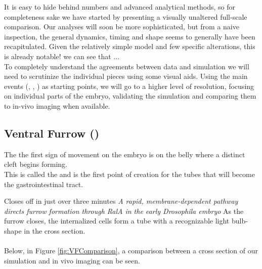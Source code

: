 It is easy to hide behind numbers and advanced analytical methods, so for completeness sake we have started by presenting a visually unaltered full-scale comparison. Our analyses will soon be more sophisticated, but from a naive inspection, the general dynamics, timing and shape seems to generally have been recapitulated. Given the relatively simple model and few specific alterations, this is already notable! we can see that ... \\ 


To completely understand the agreements between data and simulation we will need to scrutinize the individual pieces using some visual aids. Using the main events (, , ) as starting points, we will go to a higher level of resolution, focusing on individual parts of the embryo, validating the simulation and comparing them to in-vivo imaging when available.


\subsection{Ventral Furrow ()}
The the first sign of movement on the embryo is on the belly where a distinct cleft begins forming. \\
This is called the  and is the first point of creation for the tubes that will become the gastrointestinal tract.

Closes off in just over three minutes
\textit{A rapid, membrane-dependent pathway directs furrow formation through RalA in the early Drosophila embryo}
As the furrow closes, the internalized cells form a tube with a recognizable light bulb-shape in the cross section. \\
\\


Below, in Figure \ref{fig:VFComparison}, a comparison between a cross section of our simulation and in vivo imaging can be seen.

